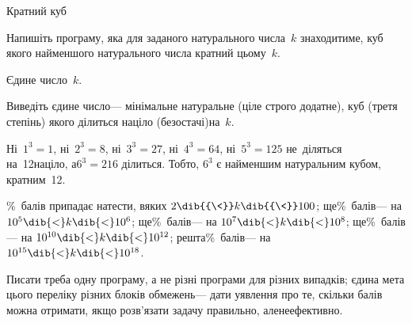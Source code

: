 \begin{problemAllDefault}{Кратний куб}

Напишіть програму, яка для заданого натурального числа~$k$ знаходитиме, куб якого найменшого натурального числа кратний цьому~$k$. 

\InputFile
Єдине число~$k$.

\OutputFile
Виведіть єдине число\nolinebreak[3] --- мінімальне натуральне (ціле строго додатне), куб (третя степінь) якого ділиться націло (без\nolinebreak[2] остачі)\nolinebreak[2] на~$k$.

\Example
\noindent\begin{exampleSimple}{5em}{5em}
\end{exampleSimple}

\Note
Ні~$1^3{=}1$, 
ні~$2^3{=}8$, 
ні~$3^3{=}27$, 
ні~$4^3{=}64$, 
ні~$5^3{=}125$ не~діляться на~12\nolinebreak[2] націло, а\nolinebreak[3] $6^3{=}216$ ділиться. Тобто, $6^3$ є найменшим натуральним кубом, кратним~12.


\%~балів припадає на\nolinebreak[3] тести, в\nolinebreak[3] яких $2\dib{{\<}}k\dib{{\<}}100$; 
ще\%~балів\nolinebreak[3] --- на $10^5\dib{{<}}k\dib{{<}}10^6$; 
ще\%~балів\nolinebreak[3] --- на $10^7\dib{{<}}k\dib{{<}}10^8$; 
ще\%~балів\nolinebreak[3] --- на $10^{10}\dib{{<}}k\dib{{<}}10^{12}$;
решта\%~балів\nolinebreak[3] --- на $10^{15}\dib{{<}}k\dib{{<}}10^{18}$.

Писати треба одну програму, а не різні програми для різних випадків; єдина мета цього переліку різних блоків обмежень\nolinebreak[3] --- дати уявлення про те, скільки балів можна отримати, якщо розв’язати задачу правильно, але\nolinebreak[2] не\nolinebreak[3] ефективно.

\end{problemAllDefault}
